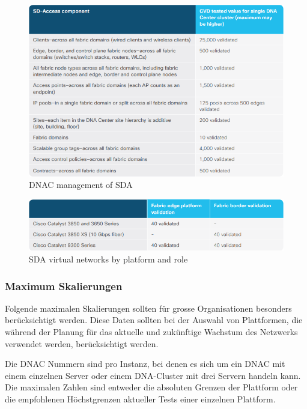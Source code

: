 \begin{figure}[H]
	\centering
	\includegraphics[width=1\linewidth]{img/Analyse/CVD-DNACmanagementofSDA-1-2-5}
	\caption{DNAC management of SDA \cite{sda-designguide-sept2018}}
	\label{fig:DNAC management of SDA}
\end{figure}


\begin{figure}[H]
	\centering
	\includegraphics[width=1\linewidth]{img/Analyse/CVD-SDAvirtualnetworksbyplatformandrole-1-2-5}
	\caption{SDA virtual networks by platform and role \cite{sda-designguide-sept2018}}
	\label{fig:SDA virtual networks by platform and role}
\end{figure}


\subsubsection{Maximum Skalierungen}
Folgende maximalen Skalierungen sollten für grosse Organisationen besonders berücksichtigt werden. Diese Daten sollten bei der Auswahl von Plattformen, die während der Planung für das aktuelle und zukünftige Wachstum des Netzwerks verwendet werden, berücksichtigt werden.

Die DNAC Nummern sind pro Instanz, bei denen es sich um ein DNAC mit einem einzelnen Server oder einem DNA-Cluster mit drei Servern handeln kann. Die maximalen Zahlen sind entweder die absoluten Grenzen der Plattform oder die empfohlenen Höchstgrenzen aktueller Tests einer einzelnen Plattform.

